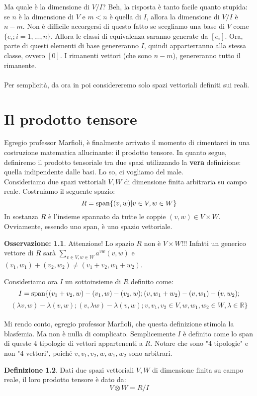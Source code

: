 \documentclass[12pt,a4paper]{report}
\theoremstyle{definition}
\newtheorem{Def}{Definizione}[chapter]
\theoremstyle{Theorem}
\theoremstyle{definition}
\theoremstyle{definition}
\theoremstyle{definition}
\newtheorem{Obs}[Def]{Osservazione:}
\begin{document}
	Ma quale è la dimensione di $V/I$? Beh, la risposta è tanto facile quanto stupida: se $n$ è la dimensione di $V$ e $m<n$ è quella di $I$, allora la dimensione di $V/I$ è $n-m$. Non è difficile accorgersi di questo fatto se scegliamo una base di $V$ come $\{e_i; i=1,...,n\}$. Allora le classi di equivalenza saranno generate da $[e_i]$. Ora, parte di questi elementi di base genereranno $I$, quindi apparterranno alla stessa classe, ovvero $[0]$. I rimanenti vettori (che sono $n-m$), genereranno tutto il rimanente.
	\\\\
	Per semplicità, da ora in poi considereremo solo spazi vettoriali definiti sui reali.
	\chapter{Il prodotto tensore}
	Egregio professor Marfioli, è finalmente arrivato il momento di cimentarci in una costruzione matematica allucinante: il prodotto tensore. In quanto segue, definiremo il prodotto tensoriale tra due spazi utilizzando la \textbf{vera} definizione: quella indipendente dalle basi. Lo so, ci vogliamo del male.
	\\
	Consideriamo due spazi vettoriali $V,W$ di dimensione finita arbitraria su campo reale. Costruiamo il seguente spazio:
	$$R=\hbox{span}\{(v,w)|v\in V, w\in W\}$$
	In sostanza $R$ è l'insieme spannato da tutte le coppie $(v,w)\in V\times W$. Ovviamente, essendo uno span, è uno spazio vettoriale.
	\begin{Obs}
		Attenzione! Lo spazio $R$ non è $V\times W$!!! Infatti un generico vettore di $R$ sarà $\sum_{v\in V,w\in W}a^{vw} (v,w)$ e $(v_1,w_1)+(v_2,w_2)\neq (v_1+v_2,w_1+w_2)$.
	\end{Obs} 
	Consideriamo ora $I$ un sottoinsieme di $R$ definito come:
	$$I=\hbox{span}\{(v_1+v_2,w)-(v_1,w)-(v_2,w); (v,w_1+w_2)-(v,w_1)-(v,w_2);$$
	$$(\lambda v,w)-\lambda(v,w);(v,\lambda w)-\lambda(v,w);v,v_1,v_2\in V, w,w_1,w_2\in W,\lambda\in \mathbb{R}\}$$
	\\
	Mi rendo conto, egregio professor Marfioli, che questa definizione stimola la blasfemia. Ma non è nulla di complicato. Semplicemente $I$ è definito come lo span di queste $4$ tipologie di vettori appartenenti a $R$. Notare che sono "4 tipologie" e non "4 vettori", poiché $v,v_1,v_2, w,w_1,w_2$ sono arbitrari.\\
	\begin{Def}
		Dati due spazi vettoriali $V,W$ di dimensione finita su campo reale, il loro prodotto tensore è dato da:
		$$V\otimes W=R/I$$
	\end{Def}
\end{document}
